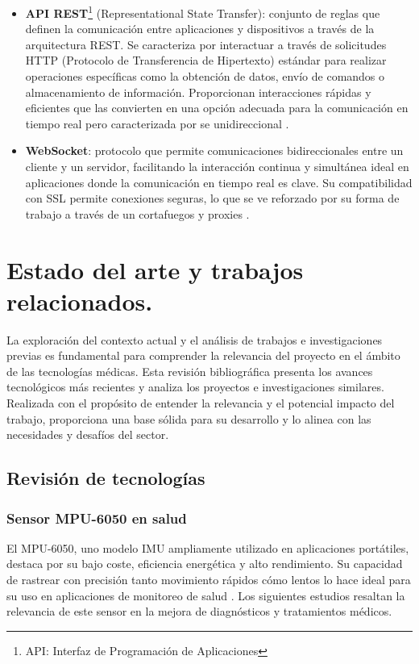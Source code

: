 \begin{itemize}
    \item \textbf{API REST}\footnote{API: Interfaz de Programación de Aplicaciones} (Representational State Transfer): conjunto de reglas que definen la comunicación entre aplicaciones y dispositivos a través de la arquitectura REST. Se caracteriza por interactuar a través de solicitudes HTTP (Protocolo de Transferencia de Hipertexto) estándar para realizar operaciones específicas como la obtención de datos, envío de comandos o almacenamiento de información. Proporcionan interacciones rápidas y eficientes que las convierten en una opción adecuada para la comunicación en tiempo real pero caracterizada por se unidireccional \cite{IBMrest:online}.
    \item \textbf{WebSocket}: protocolo que permite comunicaciones bidireccionales entre un cliente y un servidor, facilitando la interacción continua y simultánea ideal en aplicaciones donde la comunicación en tiempo real es clave. Su compatibilidad con SSL permite conexiones seguras, lo que se ve reforzado por su forma de trabajo a través de un cortafuegos y proxies \cite{WebSocke46:online}.
\end{itemize}

\section{Estado del arte y trabajos relacionados.}
La exploración del contexto actual y el análisis de trabajos e investigaciones previas es fundamental para comprender la relevancia del proyecto en el ámbito de las tecnologías médicas. Esta revisión bibliográfica presenta los avances tecnológicos más recientes y analiza los proyectos e investigaciones similares. Realizada con el propósito de entender la relevancia y el potencial impacto del trabajo, proporciona una base sólida para su desarrollo y lo alinea con las necesidades y desafíos del sector.

\subsection{Revisión de tecnologías}

\subsubsection{Sensor MPU-6050 en salud}
El MPU-6050, uno modelo IMU ampliamente utilizado en aplicaciones portátiles, destaca por su bajo coste, eficiencia energética y alto rendimiento. Su capacidad de rastrear con precisión tanto movimiento rápidos cómo lentos lo hace ideal para su uso en aplicaciones de monitoreo de salud \cite{Jian2016/06}. Los siguientes estudios resaltan la relevancia de este sensor en la mejora de diagnósticos y tratamientos médicos.

